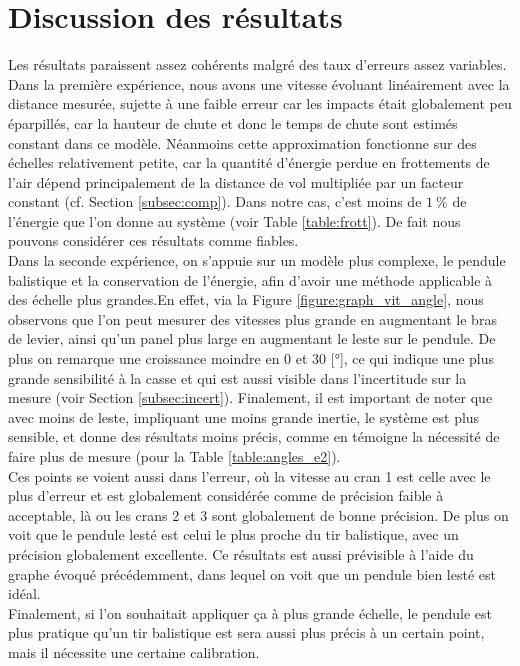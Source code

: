 \documentclass[11pt]{article}
\begin{document}
\section{Discussion des résultats}
Les résultats paraissent assez cohérents malgré des taux d'erreurs assez variables. Dans la première expérience, nous avons une vitesse évoluant linéairement avec la distance mesurée, sujette à une faible erreur car les impacts était globalement peu éparpillés, car la hauteur de chute et donc le temps de chute sont estimés constant dans ce modèle. Néanmoins cette approximation fonctionne sur des échelles relativement petite, car la quantité d'énergie perdue en frottements de l'air dépend principalement de la distance de vol multipliée par un facteur constant (cf. Section \ref{subsec:comp}). Dans notre cas, c'est moins de $1 \ \%$ de l'énergie que l'on donne au système (voir Table \ref{table:frott}). De fait nous pouvons considérer ces résultats comme fiables. \\
Dans la seconde expérience, on s'appuie sur un modèle plus complexe, le pendule balistique et la conservation de l'énergie, afin d'avoir une méthode applicable à des échelle plus grandes.En effet, via la Figure \ref{figure:graph_vit_angle}, nous observons que l'on peut mesurer des vitesses plus grande en augmentant le bras de levier, ainsi qu'un panel plus large en augmentant le leste sur le pendule. De plus on remarque une croissance moindre en 0 et 30 [°], ce qui indique une plus grande sensibilité à la casse et qui est aussi visible dans l'incertitude sur la mesure (voir Section \ref{subsec:incert}). Finalement, il est important de noter que avec moins de leste, impliquant une moins grande inertie, le système est plus sensible, et donne des résultats moins précis, comme en témoigne la nécessité de faire plus de mesure (pour la Table \ref{table:angles_e2}).\\
Ces points se voient aussi dans l'erreur, où la vitesse au cran 1 est celle avec le plus d'erreur et est globalement considérée comme de précision faible à acceptable, là ou les crans 2 et 3 sont globalement de bonne précision. De plus on voit que le pendule lesté est celui le plus proche du tir balistique, avec un précision globalement excellente. Ce résultats est aussi prévisible à l'aide du graphe évoqué précédemment, dans lequel on voit que un pendule bien lesté est idéal.\\
Finalement, si l'on souhaitait appliquer ça à plus grande échelle, le pendule est plus pratique qu'un tir balistique est sera aussi plus précis à un certain point, mais il nécessite une certaine calibration. 
\end{document}
